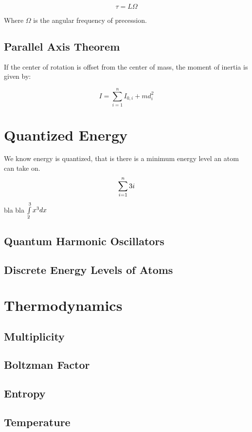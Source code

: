 \documentclass{article}
\begin{document}
$$\tau=L\Omega$$

Where $\Omega$ is the angular frequency of precession.

\subsection{Parallel Axis Theorem}

If the center of rotation is offset from the center of mass, the moment of inertia is given by:

$$I=\sum\limits_{i=1}^{n} I_{0,i} + md_{i}^2$$
\section{Quantized Energy}
We know energy is quantized, that is there is a minimum energy level an atom can take on. $$\sum \limits_{i=1}^{n} 3i $$ bla bla $\int\limits_{2}^{3}x^3 dx$

\subsection{Quantum Harmonic Oscillators}

\subsection{Discrete Energy Levels of Atoms}

\section{Thermodynamics}

\subsection{Multiplicity}

\subsection{Boltzman Factor}

\subsection{Entropy}

\subsection{Temperature}



\
\end{document}
